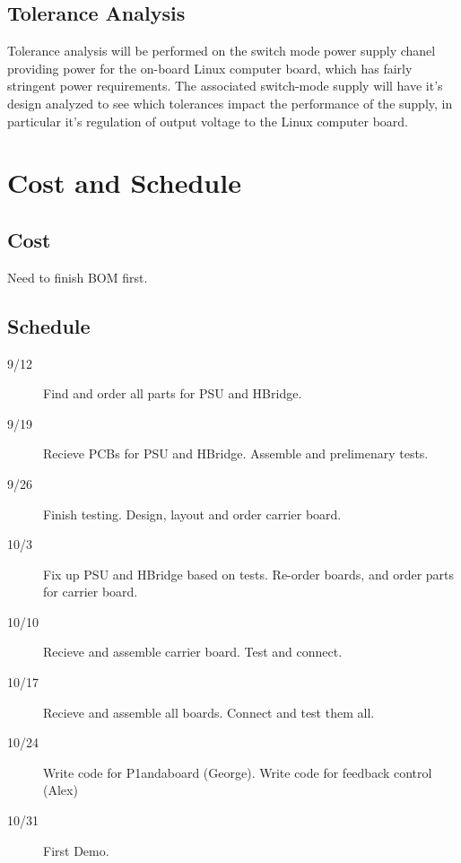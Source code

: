 \documentclass[12pt]{article}
\begin{document}
 \subsection{Tolerance Analysis}
    Tolerance analysis will be performed on the switch mode power supply chanel providing power for the on-board Linux computer board, which has fairly stringent power requirements. The associated switch-mode supply will have it's design analyzed to see which tolerances impact the performance of the supply, in particular it's regulation of output voltage to the Linux computer board.
 \section{Cost and Schedule}
 \subsection{Cost}
  Need to finish BOM first.
 \subsection{Schedule}
 \begin{description}
  \item[9/12] Find and order all parts for PSU and HBridge.
  \item[9/19] Recieve PCBs for PSU and HBridge. Assemble and prelimenary tests.
  \item[9/26] Finish testing.  Design, layout and order carrier board.
  \item[10/3] Fix up PSU and HBridge based on tests. Re-order boards, and order parts for carrier board.
  \item[10/10] Recieve and assemble carrier board. Test and connect.
  \item[10/17] Recieve and assemble all boards. Connect and test them all.
  \item[10/24] Write code for P1andaboard (George). Write code for feedback control (Alex)
  \item[10/31] First Demo.
\end{description}
 
 
\end{document}
